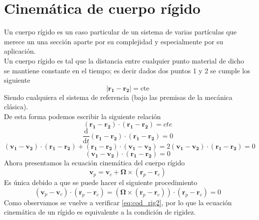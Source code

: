 \documentclass[a4paper]{article}
\numberwithin{equation}{section}
\begin{document}
\section{Cinemática de cuerpo rígido}
Un cuerpo rígido es un caso particular de un sistema de varias partículas que merece un una sección aparte por su complejidad y especialmente por su aplicación.\\
Un cuerpo rígido es tal que la distancia entre cualquier punto material de dicho se mantiene constante en el tiempo; es decir dados dos puntos 1 y 2 se cumple los siguiente
\begin{equation}
|\boldsymbol{r_1} - \boldsymbol{r_2}| = \text{cte} \label{eq:cod_rig1}
\end{equation} 
Siendo cualquiera el sistema de referencia (bajo las premisas de la mecánica clásica).\\
De esta forma podemos escribir la siguiente relación
\begin{equation*}
	(\boldsymbol{r_1} - \boldsymbol{r_2}) \cdot (\boldsymbol{r_1} - \boldsymbol{r_2}) = cte
\end{equation*}
\begin{equation*}
	\frac{\mathrm{d}}{\mathrm{d}t}(\boldsymbol{r_1} - \boldsymbol{r_2}) \cdot (\boldsymbol{r_1} - \boldsymbol{r_2}) = 0
\end{equation*}
\begin{equation*}
	(\boldsymbol{v_1} - \boldsymbol{v_2}) \cdot (\boldsymbol{r_1} - \boldsymbol{r_2}) + (\boldsymbol{r_1} - \boldsymbol{r_2}) \cdot (\boldsymbol{v_1} - \boldsymbol{v_2}) = 2 (\boldsymbol{v_1} - \boldsymbol{v_2}) \cdot (\boldsymbol{r_1} - \boldsymbol{r_2}) = 0
\end{equation*}
\begin{equation}
	(\boldsymbol{v_1} - \boldsymbol{v_2}) \cdot (\boldsymbol{r_1} - \boldsymbol{r_2}) =  0 \label{eq:cod_rig2}
\end{equation}
Ahora presentamos la ecuación cinemática del cuerpo rígido
\begin{equation}
	\boldsymbol{v}_p = \boldsymbol{v}_c + \boldsymbol{\Omega} \times (\boldsymbol{r}_p - \boldsymbol{r}_c) \label{eq:rig_cinema}
\end{equation}
Es única debido a que se puede hacer el siguiente procedimiento
\begin{equation*}
	(\boldsymbol{v}_p - \boldsymbol{v}_c) \cdot (\boldsymbol{r}_p - \boldsymbol{r}_c) = (\boldsymbol{\Omega} \times (\boldsymbol{r}_p - \boldsymbol{r}_c)) \cdot (\boldsymbol{r}_p - \boldsymbol{r}_c) = 0 
\end{equation*}
Como observamos se vuelve a verificar \ref{eq:cod_rig2}, por lo que la ecuación cinemática de un rígido es equivalente a la condición de rigidez.
\end{document}
